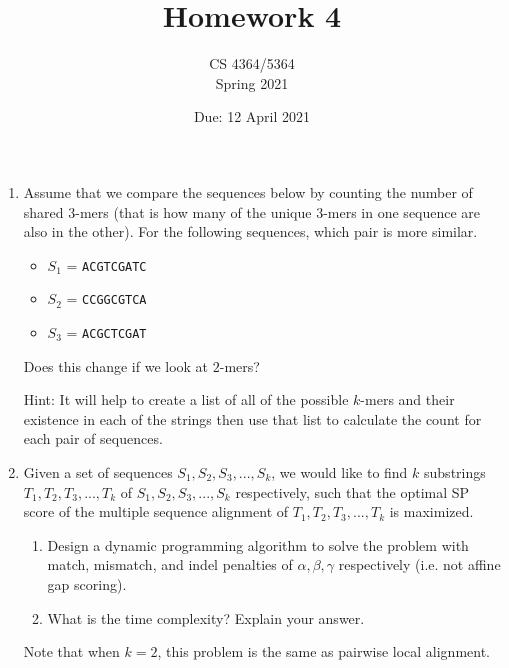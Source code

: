 \documentclass[11pt, oneside]{article}   	%
\title{Homework 4}
\author{CS 4364/5364\\Spring 2021}
\date{Due: 12 April 2021}							%
\begin{document}
\maketitle

\begin{enumerate}


\item
Assume that we compare the sequences below by counting the number of shared $3$-mers (that is how many of the unique $3$-mers in one sequence are also in the other). 
For the following sequences, which pair is more similar. 
\begin{itemize}
\item $S_1$ = \texttt{ACGTCGATC}
\item $S_2$ = \texttt{CCGGCGTCA}
\item $S_3$ = \texttt{ACGCTCGAT}
\end{itemize}


Does this change if we look at $2$-mers?

Hint: It will help to create a list of all of the possible $k$-mers and their existence in each of the strings then use that list to calculate the count for each pair of sequences. 



\item
Given a set of sequences $S_1, S_2, S_3, ..., S_k$, we would like to find $k$ substrings $T_1,T_2,T_3,...,T_k$ of $S_1, S_2, S_3, ..., S_k$ respectively, 
such that the optimal SP score of the multiple sequence alignment of  $T_1,T_2,T_3,...,T_k$ is maximized. 
\begin{enumerate}
\item Design a dynamic programming algorithm to solve the problem with match, mismatch, and indel penalties of $\alpha, \beta, \gamma$ respectively (i.e. not affine gap scoring). 
\item What is the time complexity? Explain your answer. 
\end{enumerate}
Note that when $k=2$, this problem is the same as pairwise local alignment. 


\end{enumerate}
\end{document}
